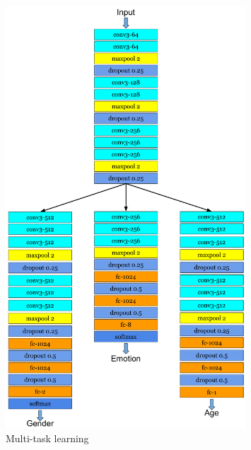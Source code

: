 \begin{figure}[]
    \begin{center}
    \includegraphics[width=0.8\textwidth]{images/multitask_real_1.pdf}
    \end{center}
    \caption{Multi-task learning} \label{fig:multitask_real_1}
\end{figure}

